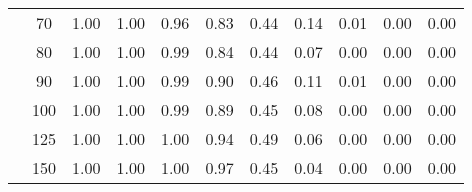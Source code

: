 \begin{table}[t]
\begin{center}
\begin{subtable}[c]{\textwidth}
\begin{center}
\begin{tabular}{rcccccccccc}
                                        & \multicolumn{1}{c|}{70}  & \num{1.00}  & \num{1.00}  & \num{0.96}  & \num{0.83}  & \num{0.44}  & \num{0.14}  & \num{0.01}  & \num{0.00}  & \num{0.00}  \\
                                        & \multicolumn{1}{c|}{80}  & \num{1.00}  & \num{1.00}  & \num{0.99}  & \num{0.84}  & \num{0.44}  & \num{0.07}  & \num{0.00}  & \num{0.00}  & \num{0.00}  \\
                                        & \multicolumn{1}{c|}{90}  & \num{1.00}  & \num{1.00}  & \num{0.99}  & \num{0.90}  & \num{0.46}  & \num{0.11}  & \num{0.01}  & \num{0.00}  & \num{0.00}  \\
                                        & \multicolumn{1}{c|}{100}  & \num{1.00}  & \num{1.00}  & \num{0.99}  & \num{0.89}  & \num{0.45}  & \num{0.08}  & \num{0.00}  & \num{0.00}  & \num{0.00}  \\
                                        & \multicolumn{1}{c|}{125}  & \num{1.00}  & \num{1.00}  & \num{1.00}  & \num{0.94}  & \num{0.49}  & \num{0.06}  & \num{0.00}  & \num{0.00}  & \num{0.00}  \\
                                        & \multicolumn{1}{c|}{150}  & \num{1.00}  & \num{1.00}  & \num{1.00}  & \num{0.97}  & \num{0.45}  & \num{0.04}  & \num{0.00}  & \num{0.00}  & \num{0.00}  \\
                                    \end{tabular}
            \end{center}
        \end{subtable}

        \vspace{5mm}


\end{center}
\end{table}
